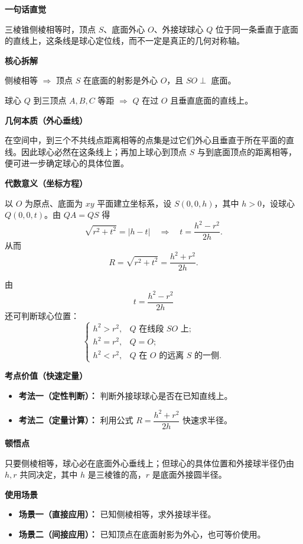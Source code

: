 \begin{explanationbox}
\textbf{\textcolor{CExplanation}{一句话直觉}}

三棱锥侧棱相等时，顶点 $S$、底面外心 $O$、外接球球心 $Q$ 位于同一条垂直于底面的直线上，这条线是球心定位线，而不一定是真正的几何对称轴。

\medskip
\textbf{\textcolor{CExplanation}{核心拆解}}
\begin{description}[style=nextline, leftmargin=2.8em, labelsep=0.5em, itemsep=0.45em]
    \item[\textbf{要点一（射影定位）：}] 侧棱相等 $\Rightarrow$ 顶点 $S$ 在底面的射影是外心 $O$，且 $SO\perp$ 底面。
    \item[\textbf{要点二（球心定位）：}] 球心 $Q$ 到三顶点 $A,B,C$ 等距 $\Rightarrow$ $Q$ 在过 $O$ 且垂直底面的直线上。
\end{description}

\medskip
\textbf{\textcolor{CExplanation}{几何本质（外心垂线）}}

在空间中，到三个不共线点距离相等的点集是过它们外心且垂直于所在平面的直线。因此球心必然在这条线上；再加上球心到顶点 $S$ 与到底面顶点的距离相等，便可进一步确定球心的具体位置。

\medskip
\textbf{\textcolor{CExplanation}{代数意义（坐标方程）}}

以 $O$ 为原点、底面为 $xy$ 平面建立坐标系，设 $S(0,0,h)$，其中 $h>0$，设球心 $Q(0,0,t)$。由 $QA=QS$ 得
\[
\sqrt{r^{2}+t^{2}} = |h-t| 
\quad\Rightarrow\quad 
t = \frac{h^{2}-r^{2}}{2h}.
\]
从而
\[
R = \sqrt{r^{2}+t^{2}} = \frac{h^{2}+r^{2}}{2h}.
\]

由
\[
t=\frac{h^{2}-r^{2}}{2h}
\]
还可判断球心位置：
\[
\begin{cases}
h^{2}>r^{2}, & Q \text{ 在线段 } SO \text{ 上};\\[4pt]
h^{2}=r^{2}, & Q=O;\\[4pt]
h^{2}<r^{2}, & Q \text{ 在 } O \text{ 的远离 } S \text{ 的一侧}.
\end{cases}
\]

\medskip
\textbf{\textcolor{CExplanation}{考点价值（快速定量）}}
\begin{itemize}[leftmargin=*, itemsep=0.5em, topsep=0.4em]
    \item \textbf{考法一（定性判断）：} 判断外接球球心是否在已知直线上。
    \item \textbf{考法二（定量计算）：} 利用公式 $R = \dfrac{h^{2}+r^{2}}{2h}$ 快速求半径。
\end{itemize}

\medskip
\textbf{\textcolor{CExplanation}{顿悟点}}

只要侧棱相等，球心必在底面外心垂线上；但球心的具体位置和外接球半径仍由 $h,r$ 共同决定，其中 $h$ 是三棱锥的高，$r$ 是底面外接圆半径。

\medskip
\textbf{\textcolor{CExplanation}{使用场景}}
\begin{itemize}[leftmargin=*, itemsep=0.5em, topsep=0.4em]
    \item \textbf{场景一（直接应用）：} 已知侧棱相等，求外接球半径。
    \item \textbf{场景二（间接应用）：} 已知顶点在底面射影为外心，也可等价使用。
\end{itemize}
\end{explanationbox}